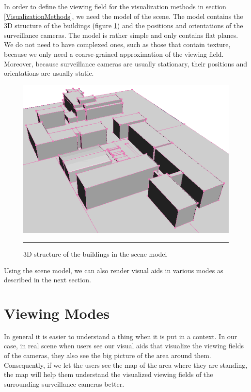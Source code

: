 In order to define the viewing field for the visualization methods in section \ref{VisualizationMethods}, we need the model of the scene. The model contains the 3D structure of the buildings (figure \ref{fig:SceneModel}) and the positions and orientations of the surveillance cameras. The model is rather simple and only contains flat planes. We do not need to have complexed ones, such as those that contain texture, because we only need a coarse-grained approximation of the viewing field. Moreover, because surveillance cameras are usually stationary, their positions and orientations are usually static.

\begin{figure}[htbp]
	\centering
	\includegraphics[width=14cm]{./Primitives/scene_model.png}
	\rule{35em}{0.5pt}
	\caption[Scene model]{3D structure of the buildings in the scene model}
	\label{fig:SceneModel}
\end{figure}

Using the scene model, we can also render visual aids in various modes as described in the next section.


\section{Viewing Modes}
\label{ViewingModes}

In general it is easier to understand a thing when it is put in a context. In our case, in real scene when users see our visual aids that visualize the viewing fields of the cameras, they also see the big picture of the area around them. Consequently, if we let the users see the map of the area where they are standing, the map will help them understand the visualized viewing fields of the surrounding surveillance cameras better.

